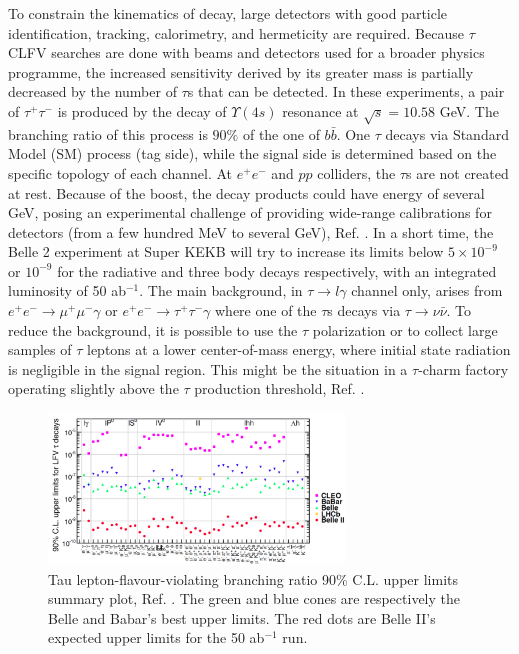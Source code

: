 To constrain the kinematics of decay, large detectors with good particle identification, tracking, calorimetry, and hermeticity are required. 
Because $\tau$ CLFV searches are done with beams and detectors used for a broader physics programme, 
the increased sensitivity derived by its greater mass is partially decreased by the number of $\tau$s that can be detected.
In these experiments, a pair of $\tau^+ \tau^-$ is produced by the decay of $\Upsilon(4s)$ resonance at $\sqrt{s}=10.58$ GeV. The branching ratio of this process is  $90\%$ of 
the one of $b \bar{b}$. One $\tau$ decays via Standard Model (SM) process (tag side), while the signal side is determined based on the specific topology of each channel. 
At $e^+ e^-$ and $pp$ colliders, the $\tau$s are not created at rest. Because of the boost, the decay products could have 
energy of several GeV, posing an experimental challenge of providing wide-range calibrations for detectors (from a few hundred MeV to several GeV), Ref. \cite{universe8060299}.
In a short time, the Belle 2 experiment at Super KEKB will try to increase its limits below $5 \times 10^{-9}$ or $10^{-9}$ for the radiative and three body decays respectively, 
with an integrated luminosity of 50 ab$^{-1}$. The main background, in $\tau \rightarrow l \gamma$ channel only, arises from
$e^+ e^- \rightarrow \mu^+ \mu^- \gamma$ or $e^+ e^- \rightarrow \tau^+ \tau^- \gamma$ where one of the $\tau$s decays via $\tau \rightarrow \nu \bar{\nu}$.
To reduce the background, it is possible to use the $\tau$ polarization or to collect large samples of
$\tau$ leptons at a lower center-of-mass energy, where initial state radiation is negligible in the signal region. This might be the situation in a $\tau$-charm 
factory operating slightly above the $\tau$ production threshold, Ref. \cite{Bennett_2016}.
\begin{figure}[!h]
\centering
\includegraphics[width =0.7\textwidth]{figures/png/Screenshot_20240319_134052.png}
\caption[Tau lepton-flavour-violating branching ratio upper limits.]{Tau lepton-flavour-violating branching ratio 90\% C.L. upper limits summary plot, Ref. \cite{universe4100101}. The green and blue cones 
are respectively the Belle and Babar's best upper limits. The red dots are Belle II's expected upper limits for the 50 ab$^{-1}$ run.}
\label{fig:tauchannel}
\end{figure}


